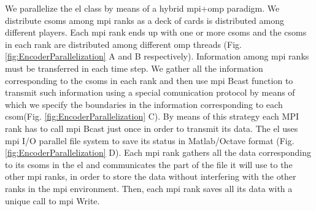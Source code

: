 \documentclass[10pt,letterpaper]{article}
\begin{document}
\pagebreak

We parallelize the \gls{el} class by means of a hybrid \gls{mpi}+\gls{omp} paradigm.
We distribute \glspl{csom} among \gls{mpi} ranks as a deck of cards is distributed among different players.
Each \gls{mpi} rank ends up with one or more \glspl{csom} and the \glspl{csom} in each rank are distributed
among different \gls{omp} threads (Fig. \ref{fig:EncoderParallelization} A and B respectively).
Information among \gls{mpi} ranks must be transferred in each time step.
We gather all the information corresponding to the \glspl{csom}
in each rank and then use \gls{mpi} Bcast function to transmit such information
using a special comunication protocol by means of which we specify the boundaries
in the information corresponding to each \gls{csom}(Fig. \ref{fig:EncoderParallelization} C).
By means of this strategy each MPI rank has to call \gls{mpi} Bcast just once
in order to transmit its data.
The \gls{el} uses \gls{mpi} I/O parallel file system to save its status in Matlab/Octave format
(Fig. \ref{fig:EncoderParallelization} D).
Each \gls{mpi} rank gathers all the data corresponding to its \glspl{csom} in the \gls{el} and
communicates the part of the file it will use to the other \gls{mpi} ranks, in order to store the data
without interfering with the other ranks in the \gls{mpi} environment.
Then, each \gls{mpi} rank saves all its data with a unique call to \gls{mpi} Write. 
\end{document}
